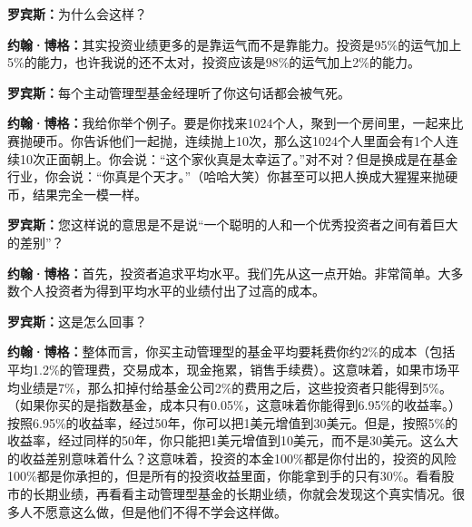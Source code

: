 \begin{BookQuote}
\textbf{罗宾斯：}为什么会这样？
\end{BookQuote}

\begin{BookQuote}
\textbf{约翰·博格：}其实投资业绩更多的是靠运气而不是靠能力。投资是95\%的运气加上5\%的能力，也许我说的还不太对，投资应该是98\%的运气加上2\%的能力。
\end{BookQuote}

\begin{BookQuote}
\textbf{罗宾斯：}每个主动管理型基金经理听了你这句话都会被气死。
\end{BookQuote}

\begin{BookQuote}
\textbf{约翰·博格：}我给你举个例子。要是你找来1024个人，聚到一个房间里，一起来比赛抛硬币。你告诉他们一起抛，连续抛上10次，那么这1024个人里面会有1个人连续10次正面朝上。你会说：“这个家伙真是太幸运了。”对不对？但是换成是在基金行业，你会说：“你真是个天才。”（哈哈大笑）你甚至可以把人换成大猩猩来抛硬币，结果完全一模一样。
\end{BookQuote}

\begin{BookQuote}
\textbf{罗宾斯：}您这样说的意思是不是说“一个聪明的人和一个优秀投资者之间有着巨大的差别”？
\end{BookQuote}

\begin{BookQuote}
\textbf{约翰·博格：}首先，投资者追求平均水平。我们先从这一点开始。非常简单。大多数个人投资者为得到平均水平的业绩付出了过高的成本。
\end{BookQuote}

\begin{BookQuote}
\textbf{罗宾斯：}这是怎么回事？
\end{BookQuote}

\begin{BookQuote}
\textbf{约翰·博格：}整体而言，你买主动管理型的基金平均要耗费你约2\%的成本（包括平均1.2\%的管理费，交易成本，现金拖累，销售手续费）。这意味着，如果市场平均业绩是7\%，那么扣掉付给基金公司2\%的费用之后，这些投资者只能得到5\%。（如果你买的是指数基金，成本只有0.05\%，这意味着你能得到6.95\%的收益率。）按照6.95\%的收益率，经过50年，你可以把1美元增值到30美元。但是，按照5\%的收益率，经过同样的50年，你只能把1美元增值到10美元，而不是30美元。这么大的收益差别意味着什么？这意味着，投资的本金100\%都是你付出的，投资的风险100\%都是你承担的，但是所有的投资收益里面，你能拿到手的只有30\%。看看股市的长期业绩，再看看主动管理型基金的长期业绩，你就会发现这个真实情况。很多人不愿意这么做，但是他们不得不学会这样做。
\end{BookQuote}

